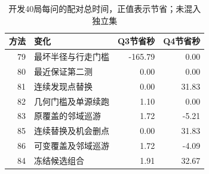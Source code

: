 \begin{table}[H]\centering\small\caption{开发40局每问的配对总时间，正值表示节省；未混入独立集}\begin{tabular}{rlrr}\toprule 方法&变化&Q3节省秒&Q4节省秒\\\midrule
79&最坏半径与行走门槛&-165.79&0.00\\
80&最近保证第二测&0.00&0.00\\
81&连续发现点替换&0.00&31.83\\
82&几何门槛及单源续跑&1.10&0.00\\
83&原覆盖的邻域巡游&1.72&-5.21\\
85&连续替换及机会删点&0.00&31.83\\
86&可变覆盖及邻域巡游&1.72&-4.09\\
84&冻结候选组合&1.91&32.67\\
\bottomrule\end{tabular}\end{table}